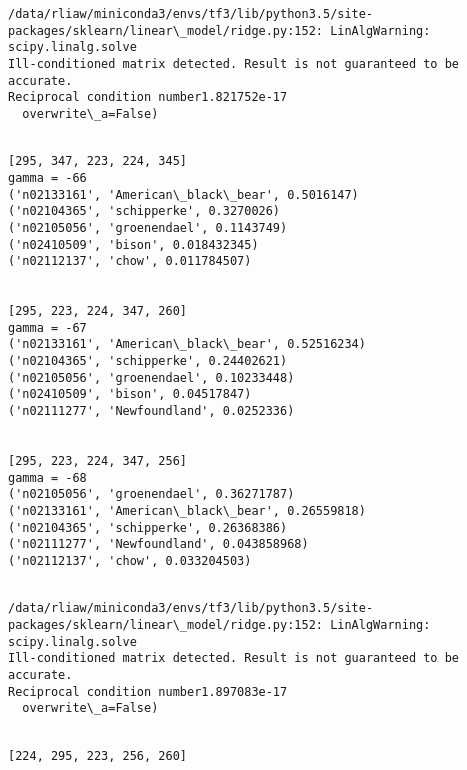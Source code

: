 \documentclass[11pt]{article}
\begin{document}
    \begin{Verbatim}[commandchars=\\\{\}]
/data/rliaw/miniconda3/envs/tf3/lib/python3.5/site-packages/sklearn/linear\_model/ridge.py:152: LinAlgWarning: scipy.linalg.solve
Ill-conditioned matrix detected. Result is not guaranteed to be accurate.
Reciprocal condition number1.821752e-17
  overwrite\_a=False)

    \end{Verbatim}

    \begin{Verbatim}[commandchars=\\\{\}]

[295, 347, 223, 224, 345]
gamma = -66
('n02133161', 'American\_black\_bear', 0.5016147)
('n02104365', 'schipperke', 0.3270026)
('n02105056', 'groenendael', 0.1143749)
('n02410509', 'bison', 0.018432345)
('n02112137', 'chow', 0.011784507)


[295, 223, 224, 347, 260]
gamma = -67
('n02133161', 'American\_black\_bear', 0.52516234)
('n02104365', 'schipperke', 0.24402621)
('n02105056', 'groenendael', 0.10233448)
('n02410509', 'bison', 0.04517847)
('n02111277', 'Newfoundland', 0.0252336)


[295, 223, 224, 347, 256]
gamma = -68
('n02105056', 'groenendael', 0.36271787)
('n02133161', 'American\_black\_bear', 0.26559818)
('n02104365', 'schipperke', 0.26368386)
('n02111277', 'Newfoundland', 0.043858968)
('n02112137', 'chow', 0.033204503)


    \end{Verbatim}

    \begin{Verbatim}[commandchars=\\\{\}]
/data/rliaw/miniconda3/envs/tf3/lib/python3.5/site-packages/sklearn/linear\_model/ridge.py:152: LinAlgWarning: scipy.linalg.solve
Ill-conditioned matrix detected. Result is not guaranteed to be accurate.
Reciprocal condition number1.897083e-17
  overwrite\_a=False)

    \end{Verbatim}

    \begin{Verbatim}[commandchars=\\\{\}]

[224, 295, 223, 256, 260]

    \end{Verbatim}

    \begin{center}
    \end{center}
    { \hspace*{\fill} \\}
    
\end{document}
